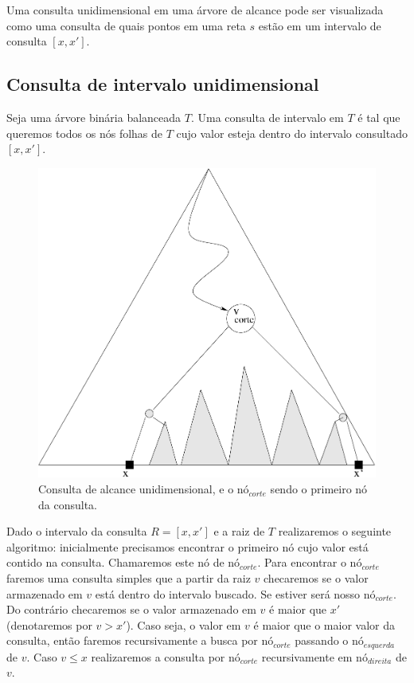 Uma consulta unidimensional em uma árvore de alcance pode ser visualizada como uma consulta de quais pontos em uma reta $s$ estão em um intervalo de consulta $[x, x']$. 

\subsection{Consulta de intervalo unidimensional}
Seja uma árvore binária balanceada $T$. Uma consulta de intervalo em $T$ é tal que queremos
todos os nós folhas de $T$ cujo valor esteja dentro do intervalo consultado $[x, x']$.

\begin{figure}[h]
    \begin{center}
        \includegraphics[scale=0.4]{images/range_tree2.pdf}
    \end{center}
    \caption{Consulta de alcance unidimensional, e o nó$_{corte}$ sendo o primeiro nó da consulta.}
\end{figure}


Dado o intervalo da consulta $R = [x , x']$ e a raiz de $T$ realizaremos o seguinte algoritmo: inicialmente precisamos encontrar o primeiro nó cujo valor está contido na consulta. Chamaremos este nó de nó$_{corte}$. Para encontrar o nó$_{corte}$ faremos uma consulta simples que a partir da raiz $v$ checaremos se o valor armazenado em $v$ está dentro do intervalo buscado. Se estiver será nosso nó$_{corte}$. Do contrário checaremos se o valor armazenado em $v$ é maior que $x'$ (denotaremos por $v > x'$). Caso seja, o valor em $v$ é maior que o maior valor da consulta, então faremos recursivamente a busca por nó$_{corte}$ passando o nó$_{esquerda}$ de $v$. Caso $v \leq x$ realizaremos a consulta por nó$_{corte}$ recursivamente
em nó$_{direita}$ de $v$.

